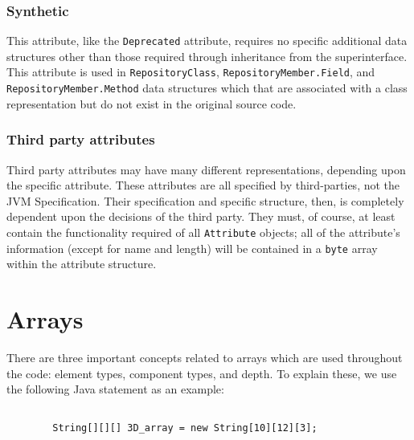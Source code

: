 \documentclass{report}
\begin{document}
\subsubsection{Synthetic}

This attribute, like the \texttt{Deprecated} attribute, requires
no specific additional data structures other than those required through
inheritance from the superinterface. This attribute is used in 
\texttt{Re\-pos\-i\-tory\-Class}, \texttt{Re\-pos\-i\-tory\-Mem\-ber.Field}, 
and \texttt{Re\-pos\-i\-tory\-Mem\-ber.Meth\-od} data structures which that 
are associated with a class representation but do not exist in the original 
source code.

\subsubsection{Third party attributes}

Third party attributes may have many different representations, depending
upon the specific attribute. These attributes are all specified by 
third-parties, not the JVM Specification. Their specification and specific 
structure, then, is completely dependent upon the decisions of the third party.
They must, of course, at least contain the functionality required of all
\texttt{Attribute} objects; all of the attribute's information
(except for name and length) will be contained in a \texttt{byte} array
within the attribute structure.

\section{Arrays}\label{arrays}

There are three important concepts related to arrays which are
used throughout the code: element types, component types, and
depth. To explain these, we use the following Java statement as an example:

\begin{verbatim}

        String[][][] 3D_array = new String[10][12][3];

\end{verbatim}
\end{document}
